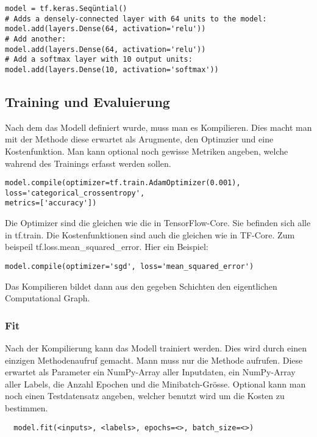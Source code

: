 \begin{verbatim}
model = tf.keras.Seqüntial()
# Adds a densely-connected layer with 64 units to the model:
model.add(layers.Dense(64, activation='relu'))
# Add another:
model.add(layers.Dense(64, activation='relu'))
# Add a softmax layer with 10 output units:
model.add(layers.Dense(10, activation='softmax'))
\end{verbatim}


\subsection{Training und Evaluierung}

Nach dem das Modell definiert wurde, muss man es Kompilieren.
Dies macht man mit der Methode  diese erwartet als
Arugmente, den Optimzier und eine Kostenfunktion. Man kann optional noch gewisse
Metriken angeben, welche wahrend des Trainings erfasst werden sollen.
\begin{verbatim}
model.compile(optimizer=tf.train.AdamOptimizer(0.001),
loss='categorical_crossentropy',
metrics=['accuracy'])
\end{verbatim}
Die Optimizer sind die gleichen wie die in TensorFlow-Core. Sie befinden sich
alle in tf.train. Die Kostenfunktionen sind auch die gleichen wie in TF-Core.
Zum beispeil tf.loss.mean\_squared\_error.
\para{}
Hier ein Beispiel:
\begin{verbatim}
model.compile(optimizer='sgd', loss='mean_squared_error')
\end{verbatim}
Das Kompilieren bildet dann aus den gegeben Schichten den eigentlichen
Computational Graph.

\subsubsection{Fit}
Nach der Kompilierung kann das Modell trainiert werden. Dies wird durch einen
einzigen Methodenaufruf gemacht. Mann muss nur die  Methode aufrufen.
Diese erwartet als Parameter ein NumPy-Array aller Inputdaten, ein NumPy-Array
aller Labels, die Anzahl Epochen und die Minibatch-Grösse.
Optional kann man noch einen Testdatensatz angeben, welcher benutzt wird um die
Kosten zu bestimmen.
\begin{verbatim}
  model.fit(<inputs>, <labels>, epochs=<>, batch_size=<>)
\end{verbatim}

